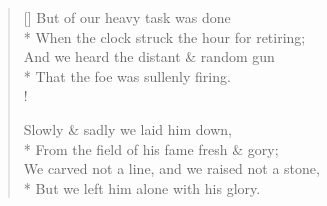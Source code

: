 \documentclass[MAIN]{subfiles}
\begin{document}
\begin{verse}[\versewidth]
But  of our heavy task was done\\*
\vin When the clock struck the hour for retiring;\\
And we heard the distant \& random gun\\*
\vin That the foe was sullenly firing.\\!

Slowly \& sadly we laid him down,\\*
\vin From the field of his fame fresh \& gory;\\
We carved not a line, and we raised not a stone,\\*
\vin But we left him alone with his glory.
\end{verse}
\end{document}
